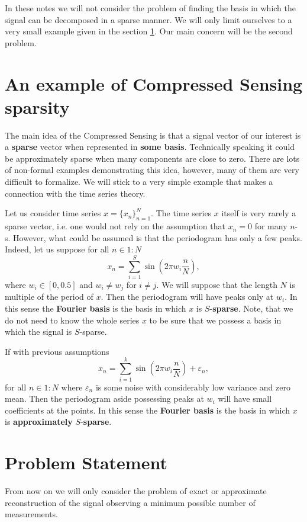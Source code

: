 \documentclass[11pt]{article}
\numberwithin{equation}{section}
\theoremstyle{definition}
\begin{document}
In these notes we will not consider the problem of finding the basis in which the signal can be decomposed in a sparse manner.
We will only limit ourselves to a very small example given in the section \ref{sec:motivation}.
Our main concern will be the second problem.

\section{An example of Compressed Sensing sparsity}
\label{sec:motivation}
The main idea of the Compressed Sensing is that a signal vector of our interest is a \textbf{sparse} vector when represented in \textbf{some basis}.
Technically speaking it could be approximately sparse when many components are close to zero.
There are lots of non-formal examples demonstrating this idea, however, many of them are very difficult to formalize.
We will stick to a very simple example that makes a connection with the time series theory.

Let us consider time series $x = \{x_n\}_{n=1}^N$.
The time series $x$ itself is very rarely a sparse vector, i.e. one would not rely on the assumption that $x_n = 0$ for many $n$-s.
However, what could be assumed is that the periodogram has only a few peaks.
Indeed, let us suppose for all $n \in 1:N$
$$ x_n = \sum_{i=1}^S \sin\left(2 \pi w_i \frac{n}{N}\right), $$
where $w_i \in [0, 0.5]$ and $w_i \neq w_j$ for $i \neq j$.
We will suppose that the length $N$ is multiple of the period of $x$.
Then the periodogram will have peaks only at $w_i$.
In this sense the \textbf{Fourier basis} is the basis in which $x$ is $S$-\textbf{sparse}.
Note, that we do not need to know the whole series $x$ to be sure that we possess a basis in which the signal is $S$-sparse.

If with previous assumptions 
$$ x_n = \sum_{i=1}^k \sin\left(2 \pi w_i \frac{n}{N}\right) + \varepsilon_n, $$
for all $n \in 1:N$
where $\varepsilon_n$ is some noise with considerably low variance and zero mean.
Then the periodogram aside possessing peaks at $w_i$ will have small coefficients at the points.
In this sense the \textbf{Fourier basis} is the basis in which $x$ is \textbf{approximately} $S$-\textbf{sparse}.

\section{Problem Statement}
From now on we will only consider the problem of exact or approximate reconstruction of the signal observing a minimum possible number of measurements.
\end{document}
